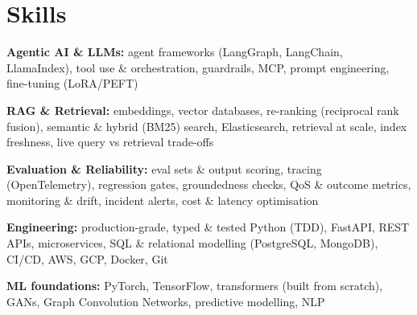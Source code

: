 \documentclass[10pt,a4paper]{article}
\begin{document}
\section{Skills}
\begin{tight}
  \item[\textcolor{accent}{\small$\bullet$}] \textbf{Agentic AI \& LLMs:} agent frameworks (LangGraph, LangChain, LlamaIndex), tool use \& orchestration, guardrails, MCP, prompt engineering, fine-tuning (LoRA/PEFT)
  \item[\textcolor{accent}{\small$\bullet$}] \textbf{RAG \& Retrieval:} embeddings, vector databases, re-ranking (reciprocal rank fusion), semantic \& hybrid (BM25) search, Elasticsearch, retrieval at scale, index freshness, live query vs retrieval trade-offs
  \item[\textcolor{accent}{\small$\bullet$}] \textbf{Evaluation \& Reliability:} eval sets \& output scoring, tracing (OpenTelemetry), regression gates, groundedness checks, QoS \& outcome metrics, monitoring \& drift, incident alerts, cost \& latency optimisation
  \item[\textcolor{accent}{\small$\bullet$}] \textbf{Engineering:} production-grade, typed \& tested Python (TDD), FastAPI, REST APIs, microservices, SQL \& relational modelling (PostgreSQL, MongoDB), CI/CD, AWS, GCP, Docker, Git
  \item[\textcolor{accent}{\small$\bullet$}] \textbf{ML foundations:} PyTorch, TensorFlow, transformers (built from scratch), GANs, Graph Convolution Networks, predictive modelling, NLP
\end{tight}

\end{document}

